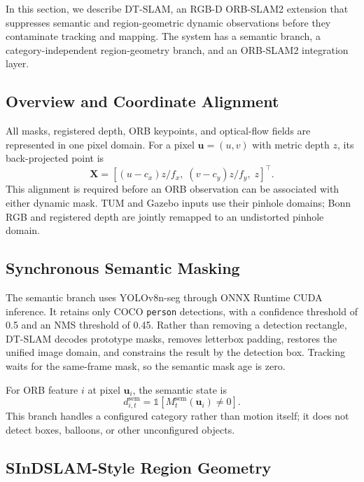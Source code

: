 \documentclass[10pt]{article}
\begin{document}
In this section, we describe DT-SLAM, an RGB-D ORB-SLAM2 extension that suppresses semantic and region-geometric dynamic observations before they contaminate tracking and mapping. The system has a semantic branch, a category-independent region-geometry branch, and an ORB-SLAM2 integration layer.

\subsection{Overview and Coordinate Alignment}

All masks, registered depth, ORB keypoints, and optical-flow fields are represented in one pixel domain. For a pixel $\mathbf{u}=(u,v)$ with metric depth $z$, its back-projected point is
\begin{equation}
\mathbf{X}=\left[(u-c_x)z/f_x,\;(v-c_y)z/f_y,\;z\right]^\top.
\label{eq:backproject}
\end{equation}
This alignment is required before an ORB observation can be associated with either dynamic mask. TUM and Gazebo inputs use their pinhole domains; Bonn RGB and registered depth are jointly remapped to an undistorted pinhole domain.

\subsection{Synchronous Semantic Masking}

The semantic branch uses YOLOv8n-seg \citep{yolov8} through ONNX Runtime CUDA inference. It retains only COCO \texttt{person} detections, with a confidence threshold of 0.5 and an NMS threshold of 0.45. Rather than removing a detection rectangle, DT-SLAM decodes prototype masks, removes letterbox padding, restores the unified image domain, and constrains the result by the detection box. Tracking waits for the same-frame mask, so the semantic mask age is zero.

For ORB feature $i$ at pixel $\mathbf{u}_i$, the semantic state is
\begin{equation}
d_{i,t}^{\mathrm{sem}}=\mathbb{1}\left[M_t^{\mathrm{sem}}(\mathbf{u}_i)\neq0\right].
\end{equation}
This branch handles a configured category rather than motion itself; it does not detect boxes, balloons, or other unconfigured objects.

\subsection{SInDSLAM-Style Region Geometry}
\end{document}
